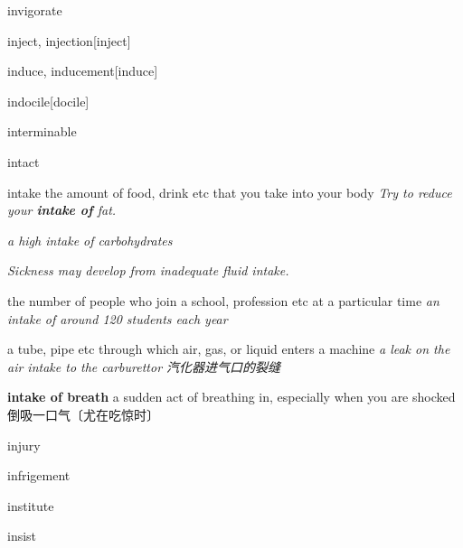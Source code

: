 \begin{RefWord}{invigorate}
\end{RefWord}

\begin{RefWord}{inject, injection}[inject]
\end{RefWord}

\begin{RefWord}{induce, inducement}[induce]
\end{RefWord}

\begin{RefWord}{indocile}[docile]
\end{RefWord}

\begin{RefWord}{interminable}
\end{RefWord}

\begin{RefWord}{intact}
\end{RefWord}

\begin{RefWord}{intake}
    the amount of food, drink etc that you take into your body
    \textit{Try to reduce your \textbf{intake of} fat.}

    \textit{a high intake of carbohydrates}

    \textit{Sickness may develop from inadequate fluid intake.}

    the number of people who join a school, profession etc at a particular time
    \textit{an intake of around 120 students each year}

    a tube, pipe etc through which air, gas, or liquid enters a machine
    \textit{a leak on the air intake to the carburettor 汽化器进气口的裂缝}

    \textbf{intake of breath} a sudden act of breathing in, especially when you are shocked倒吸一口气〔尤在吃惊时〕
\end{RefWord}

\begin{RefWord}{injury}
\end{RefWord}

\begin{RefWord}{infrigement}
\end{RefWord}

\begin{RefWord}{institute}
\end{RefWord}

\begin{RefWord}{insist}
\end{RefWord}


